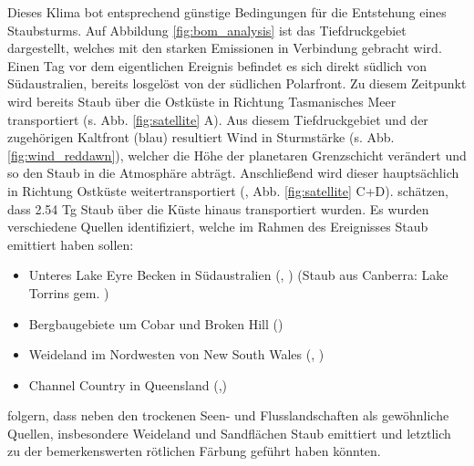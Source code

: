\documentclass[12pt,a4paper,onecolumn]{scrartcl}
\begin{document}
Dieses Klima bot entsprechend günstige Bedingungen für die Entstehung eines Staubsturms. Auf Abbildung \ref{fig:bom_analysis} ist das Tiefdruckgebiet dargestellt, welches mit den starken Emissionen in Verbindung gebracht wird. Einen Tag vor dem eigentlichen Ereignis befindet es sich direkt südlich von Südaustralien, bereits losgelöst von der südlichen Polarfront. Zu diesem Zeitpunkt wird bereits Staub über die Ostküste in Richtung Tasmanisches Meer transportiert (s. Abb. \ref{fig:satellite} A). Aus diesem Tiefdruckgebiet und der zugehörigen Kaltfront (blau) resultiert Wind in Sturmstärke (s. Abb. \ref{fig:wind_reddawn}), welcher die Höhe der planetaren Grenzschicht verändert \citep{AlizadehChoobari.2012} und so den Staub in die Atmosphäre abträgt. Anschließend wird dieser hauptsächlich in Richtung Ostküste weitertransportiert (\cite{Leys.2011}, Abb. \ref{fig:satellite} C+D). \citet{Leys.2011} schätzen, dass 2.54 Tg Staub über die Küste hinaus transportiert wurden. Es wurden verschiedene Quellen identifiziert, welche im Rahmen des Ereignisses Staub emittiert haben sollen:
\begin{itemize}
\item Unteres Lake Eyre Becken in Südaustralien (\cite{Leys.2011}, \cite{Leys.2009}) (Staub aus Canberra: Lake Torrins gem. \cite{Deckker.2014})
\item Bergbaugebiete um Cobar und Broken Hill  (\cite{Leys.2011})
\item Weideland im Nordwesten von New South Wales (\cite{Leys.2011}, \cite{Leys.2009})
\item Channel Country in Queensland (\cite{Leys.2011},\cite{Leys.2009})
\end{itemize}
\citet{Leys.2011} folgern, dass neben den trockenen Seen- und Flusslandschaften als gewöhnliche Quellen, insbesondere Weideland und Sandflächen Staub emittiert und letztlich zu der bemerkenswerten rötlichen Färbung geführt haben könnten.
\end{document}
